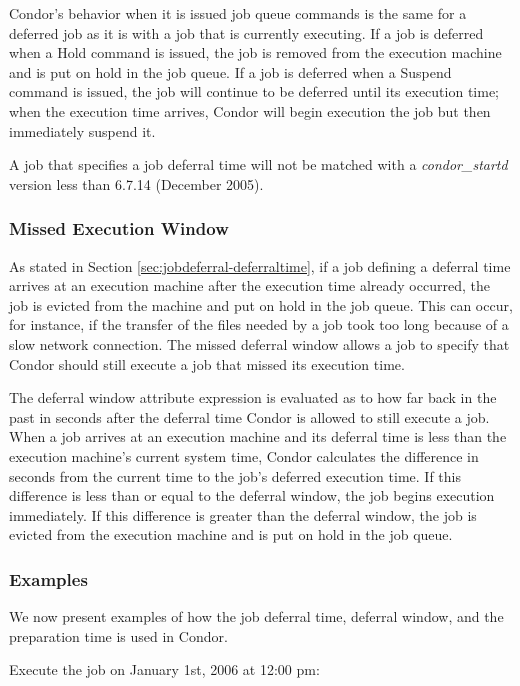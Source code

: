 \documentclass[a4paper, 11pt]{article}
\newcommand{\Prog}[1]{\textit{#1}}              	%
\newcommand{\Condor}[1]{\Prog{condor\_#1}}
\begin{document}
Condor's behavior when it is issued job queue commands is the same for a deferred job as it is with a job that is currently executing. If a job is deferred when a Hold command is issued, the job is removed from the execution machine and is put on hold in the job queue. If a job is deferred when a Suspend command is issued, the job will continue to be deferred until its execution time; when the execution time arrives, Condor will begin execution the job but then immediately suspend it.

A job that specifies a job deferral time will not be matched with a \Condor{startd} version less than 6.7.14 (December 2005).

\subsubsection{Missed Execution Window}
\label{sec:jobdeferral-deferralwindow}
As stated in Section \ref{sec:jobdeferral-deferraltime}, if a job defining a deferral time arrives at an execution machine after the execution time already occurred, the job is evicted from the machine and put on hold in the job queue. This can occur, for instance, if the transfer of the files needed by a job took too long because of a slow network connection. The missed deferral window allows a job to specify that Condor should still execute a job that missed its execution time.

The deferral window attribute expression is evaluated as to how far back in the past in seconds after the deferral time Condor is allowed to still execute a job. When a job arrives at an execution machine and its deferral time is less than the execution machine's current system time, Condor calculates the difference in seconds from the current time to the job's deferred execution time. If this difference is less than or equal to the deferral window, the job begins execution immediately. If this difference is greater than the deferral window, the job is evicted from the execution machine and is put on hold in the job queue.

\subsubsection{Examples}
\label{sec:jobdeferral-examples}
We now present examples of how the job deferral time, deferral window, and the preparation time is used in Condor.

Execute the job on January 1st, 2006 at 12:00 pm:
\end{document}
